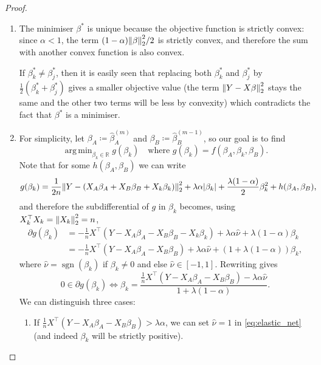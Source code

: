 \documentclass{article}
\theoremstyle{plain}
\theoremstyle{remark}
\newcommand{\Bb}{\mathbb}
\newcommand{\RR}{\Bb R}
\newcommand{\T}{^\top} %
\newcommand\ceq\coloneqq %
\newcommand\pt\partial
\DeclareMathOperator{\sign}{sgn}
\DeclareMathOperator*{\argmin}{arg\,min}
\begin{document}
\begin{proof}
	\begin{enumerate}
		\item The minimiser $\beta^*$ is unique because the objective function is strictly convex: since $\alpha < 1$, the term $(1-\alpha) \norm{\beta}_2^2 / 2$ is strictly convex, and therefore the sum with another convex function is also convex. 
		
		If $\beta_k^* \neq \beta_j^*$, then it is easily seen that replacing both $\beta_k^*$ and $\beta_j^*$ by $\frac12(\beta_k^* + \beta_j^*)$ gives a smaller objective value (the term $\norm{Y - X\beta}_2^2$ stays the same and the other two terms will be less by convexity) which contradicts the fact that $\beta^*$ is a minimiser. 
		
		\item For simplicity, let $\beta_A \ceq \hat\beta_A^{(m)}$ and $\beta_B \ceq \hat\beta_B^{(m-1)}$, so our goal is to find
		\[
		\argmin_{\beta_k \in \RR} g(\beta_k) \quad\text{where } g(\beta_k) = f(\beta_A, \beta_k, \beta_B). 
		\]
		Note that for some $h(\beta_A, \beta_B)$ we can write
		\begin{align*}
			g(\beta_k) &= \frac1{2n} \norm{Y - (X_A \beta_A + X_B \beta_B + X_k \beta_k)}_2^2 + \lambda \alpha \abs{\beta_k} + \frac{\lambda(1-\alpha)}{2} \beta_k^2 + h(\beta_A, \beta_B),
		\end{align*}
		and therefore the subdifferential of $g$ in $\beta_k$ becomes, using $X_k\T X_k = \norm{X_k}_2^2= n$, 
		\begin{align*}
		\pt g(\beta_k) &= - \frac1n X\T (Y - X_A\beta_A - X_B\beta_B - X_k\beta_k) + \lambda \alpha \hat \nu + \lambda(1-\alpha)\beta_k \\
		&= -\frac1n X\T(Y - X_A\beta_A - X_B\beta_B) + \lambda \alpha \hat\nu + (1 + \lambda(1-\alpha))\beta_k, 
		\end{align*}
	where $\hat\nu = \sign(\beta_k)$ if $\beta_k \neq 0$ and else $\hat\nu \in [-1, 1]$. 
	Rewriting gives
	\begin{equation} \label{eq:elastic_net}
	0 \in \pt g(\beta_k) \iff \beta_k = \frac{\frac1n X\T(Y - X_A\beta_A - X_B\beta_B) - \lambda\alpha\hat\nu}{1 + \lambda(1-\alpha)}.
	\end{equation}
	We can distinguish three cases: 
	\begin{enumerate}
		\item If $\frac1n X\T (Y - X_A\beta_A - X_B\beta_B) > \lambda\alpha$, we can set $\hat\nu = 1$ in \cref{eq:elastic_net} (and indeed $\beta_k$ will be strictly positive).

\end{enumerate}
\end{enumerate}
\end{proof}
\end{document}
